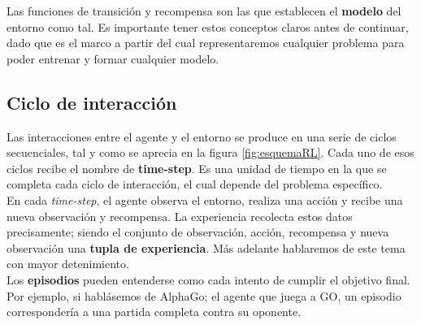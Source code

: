 \documentclass[11pt,fleqn]{book} %
\begin{document}
Las funciones de transición y recompensa son las que establecen el \textbf{modelo} del entorno como tal. Es importante tener estos conceptos claros antes de continuar, dado que es el marco a partir del cual representaremos cualquier problema para poder entrenar y formar cualquier modelo. \\



\subsection{Ciclo de interacción}\label{sec:episodios}


Las interacciones entre el agente y el entorno se produce en una serie de ciclos secuenciales, tal y como se aprecia en la figura \ref{fig:esquemaRL}. Cada uno de esos ciclos recibe el nombre de \textbf{time-step}. Es una unidad de tiempo en la que se completa cada ciclo de interacción, el cual depende del problema específico. \\

En cada \textit{time-step}, el agente observa el entorno, realiza una acción y recibe una nueva observación y recompensa. La experiencia recolecta estos datos precisamente; siendo el conjunto de observación, acción, recompensa y nueva observación una \textbf{tupla de experiencia}. Más adelante hablaremos de este tema con mayor detenimiento. \\

Los \textbf{episodios} pueden entenderse como cada intento de cumplir el objetivo final. Por ejemplo, si hablásemos de AlphaGo; el agente que juega a GO, un episodio correspondería a una partida completa contra su oponente. \\
\end{document}
